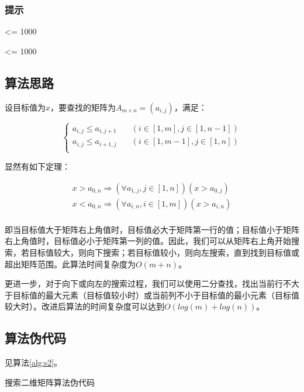 
\subsubsection*{提示}
 <= 1000

 <= 1000

\subsection{算法思路}

设目标值为$x$，要查找的矩阵为$A_{m\times n}=(a_{i,j})$，满足：

$$
\left\{
\begin{aligned}
a_{i,j}\leq a_{i,j+1}&\quad (i\in[1,m],j\in[1,n-1])\\
a_{i,j}\leq a_{i+1,j}&\quad (i\in[1,m-1],j\in[1,n])\\
\end{aligned}
\right.
$$

显然有如下定理：

$$
\begin{aligned}
x>a_{0,n}\Rightarrow(\forall a_{1,j},j\in[1,n])(x>a_{0,j})\\
x<a_{0,n}\Rightarrow(\forall a_{i,n},i\in[1,m])(x>a_{i,n})\\
\end{aligned}
$$

即当目标值大于矩阵右上角值时，目标值必大于矩阵第一行的值；目标值小于矩阵右上角值时，目标值必小于矩阵第一列的值。因此，我们可以从矩阵右上角开始搜索，若目标值较大，则向下搜索；若目标值较小，则向左搜索，直到找到目标值或超出矩阵范围。此算法时间复杂度为$O(m+n)$。

更进一步，对于向下或向左的搜索过程，我们可以使用二分查找，找出当前行不大于目标值的最大元素（目标值较小时）或当前列不小于目标值的最小元素（目标值较大时）。改进后算法的时间复杂度可以达到$O(log(m)+log(n))$。

\subsection{算法伪代码}

见算法\ref{alg:s2}。
\begin{algorithm}[htbp]
\caption{搜索二维矩阵算法伪代码}\label{alg:s2}
\end{algorithm}